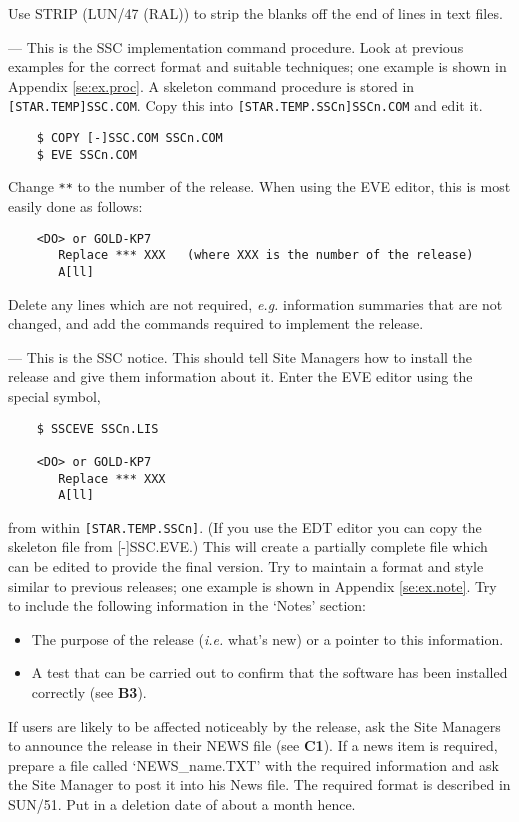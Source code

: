 \begin{description}
Use STRIP (LUN/47 (RAL)) to strip the blanks off the end of lines in text files.

\item [A7 : PREPARE SSCn.COM] ---
This is the SSC implementation command procedure.
Look at previous examples for the correct format and suitable techniques; one
example is shown in Appendix \ref{se:ex.proc}.
A skeleton command procedure is stored in {\tt [STAR.TEMP]SSC.COM}.
Copy this into {\tt [STAR.TEMP.SSCn]\-SSCn.\-COM} and edit it.
\begin{verbatim}
    $ COPY [-]SSC.COM SSCn.COM
    $ EVE SSCn.COM
\end{verbatim}
Change {\tt ***} to the number of the release.
When using the EVE editor, this is most easily done as follows:
\begin{verbatim}
    <DO> or GOLD-KP7
       Replace *** XXX   (where XXX is the number of the release)
       A[ll]
\end{verbatim}
Delete any lines which are not required, {\em e.g.} information summaries that
are not changed, and add the commands required to implement the release.

\item [A8 : PREPARE SSCn.LIS] ---
This is the SSC notice.
This should tell Site Managers how to install the release and give them
information about it.
Enter the EVE editor using the special symbol,
\begin{verbatim}
    $ SSCEVE SSCn.LIS
    
    <DO> or GOLD-KP7
       Replace *** XXX
       A[ll]
\end{verbatim}
from within {\tt [STAR.TEMP.SSCn]}.
(If you use the EDT editor you can copy the skeleton file from [-]SSC.EVE.)
This will create a partially complete file which can be edited to provide the
final version.
Try to maintain a format and style similar to previous releases; one example is
shown in Appendix \ref{se:ex.note}.
Try to include the following information in the `Notes' section:
\begin{itemize}
\item The purpose of the release ({\em i.e.} what's new) or a pointer to this
information.
\item A test that can be carried out to confirm that the software has been
installed correctly (see {\bf B3}).
\end{itemize}
If users are likely to be affected noticeably by the release, ask the Site
Managers to announce the release in their NEWS file (see {\bf C1}).
If a news item is required, prepare a file called `NEWS\_name.TXT' with the
required information and ask the Site Manager to post it into his News file.
The required format is described in SUN/51.
Put in a deletion date of about a month hence.


\end{description}
